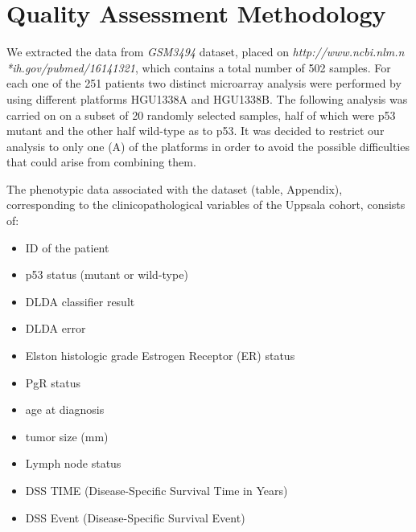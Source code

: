 \documentclass{article}
\begin{document}
\section{Quality Assessment Methodology}
We extracted the data from {\it GSM3494} dataset, placed on {\it http://www.ncbi.nlm.n\\*ih.gov/pubmed/16141321}, which contains a total number of 502 samples. For each one of the 251 patients two distinct microarray analysis were performed by using different platforms HGU1338A and HGU1338B. The following analysis was carried on on a subset of 20 randomly selected samples, half of which were p53 mutant and the other half wild-type as to p53. It was decided to restrict our analysis to only one (A) of the platforms in order to avoid the possible difficulties that could arise from combining them.\par
The phenotypic data associated with the dataset (table, Appendix), corresponding to the clinicopathological variables of the Uppsala cohort, consists of:
\begin{itemize}
	\item ID of the patient
	\item p53 status (mutant or wild-type)
	\item DLDA classifier result
	\item DLDA error
	\item Elston histologic grade Estrogen Receptor (ER) status
	\item PgR status
	\item age at diagnosis
	\item tumor size (mm) 
	\item Lymph node status
	\item DSS TIME (Disease-Specific Survival Time in Years) 
	\item DSS Event (Disease-Specific Survival Event)
\end{itemize}
\end{document}
